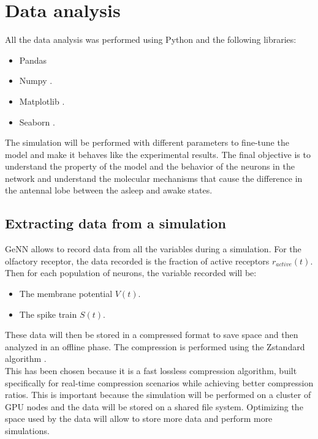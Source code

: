 \section{Data analysis}
All the data analysis was performed using Python and the following libraries:

\begin{multicols}{2}
  \begin{itemize}
    \item Pandas \cite{pandas}
    \item Numpy \cite{numpy}.
    \item Matplotlib \cite{matplotlib}.
    \item Seaborn \cite{seaborn}.
  \end{itemize}
\end{multicols}

The simulation will be performed with different parameters to fine-tune the model and make it behaves like the experimental results.
The final objective is to understand the property of the model and the behavior of the neurons in the network and understand the molecular mechanisms that cause the difference in the antennal lobe between the asleep and awake states.

  \subsection{Extracting data from a simulation}
  GeNN allows to record data from all the variables during a simulation.
  For the olfactory receptor, the data recorded is the fraction of active receptors $r_{active}(t)$.
  Then for each population of neurons, the variable recorded will be:

  \begin{multicols}{2}
    \begin{itemize}
      \item The membrane potential $V(t)$.
      \item The spike train $S(t)$.
    \end{itemize}
  \end{multicols}

  These data will then be stored in a compressed format to save space and then analyzed in an offline phase.
  The compression is performed using the Zstandard algorithm \cite{zstandard}.\\
  This has been chosen because it is a fast lossless compression algorithm, built specifically for real-time compression scenarios while achieving better compression ratios.
  This is important because the simulation will be performed on a cluster of GPU nodes and the data will be stored on a shared file system.
  Optimizing the space used by the data will allow to store more data and perform more simulations.

